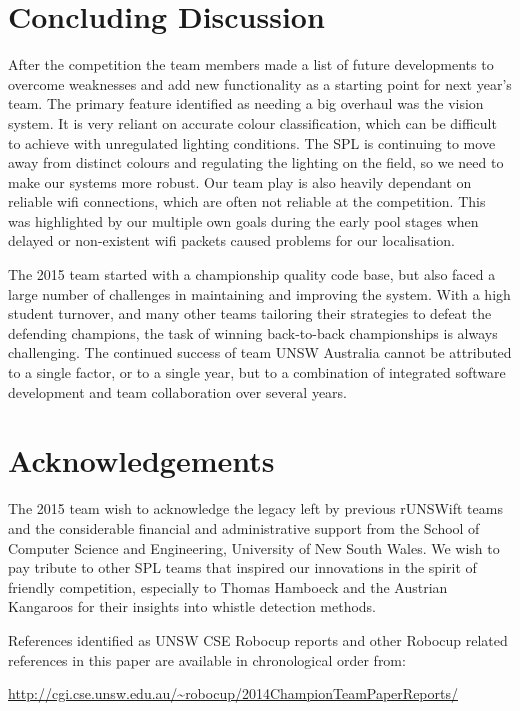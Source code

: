 \documentclass[runningheads,a4paper]{llncs}
\begin{document}
\section{Concluding Discussion}

After the competition the team members made a list of future developments to overcome weaknesses and add new functionality as a starting point for next year's team. The primary feature identified as needing a big overhaul was the vision system. It is very reliant on accurate colour classification, which can be difficult to achieve with unregulated lighting conditions. The SPL is continuing to move away from distinct colours and regulating the lighting on the field, so we need to make our systems more robust. Our team play is also heavily dependant on reliable wifi connections, which are often not reliable at the competition. This was highlighted by our multiple own goals during the early pool stages when delayed or non-existent wifi packets caused problems for our localisation.

The 2015 team started with a championship quality code base, but also faced a large number of challenges in maintaining and improving the system. With a high student turnover, and many other teams tailoring their strategies to defeat the defending champions, the task of winning back-to-back championships is always challenging. The continued success of team UNSW Australia cannot be attributed to a single factor, or to a single year, but to a combination of integrated software development and team collaboration over several years. 


\section*{Acknowledgements}
The 2015 team wish to acknowledge the legacy left by previous rUNSWift teams and the considerable financial and administrative support from the School of Computer Science and Engineering, University of New South Wales. We wish to pay tribute to other SPL teams that inspired our innovations in the spirit of friendly competition, especially to Thomas Hamboeck and the Austrian Kangaroos for their insights into whistle detection methods.





\newpage

\noindent References identified as UNSW CSE Robocup reports and other Robocup related references in this paper are available in chronological order from:

\noindent  \url{ http://cgi.cse.unsw.edu.au/~robocup/2014ChampionTeamPaperReports/ }



\end{document}
